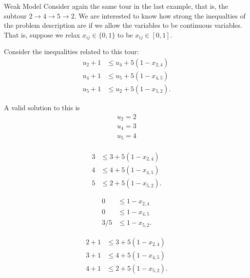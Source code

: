 \begin{example}{Weak Model}{}
Consider again the same tour in the last example, that is, the subtour $2 \to 4 \to 5 \to 2$.  
We are interested to know how strong the inequalties of the problem description are if we allow the variables to be continuous variables.  That is, suppose we relax $x_{ij} \in \{0,1\}$ to be $x_{ij} \in [0,1]$.

Consider the inequalities related to this tour:
\begin{align*}
u_{2} +1 &\leq  u_{4} + 5 (1-x_{2,4} )\\
u_{4} +1 &\leq  u_{5} + 5 (1-x_{4,5})\\
u_{5} +1 &\leq  u_{2} + 5 (1-x_{5,2} ).
\end{align*}

A valid solution to this is 
\begin{align*}
u_2 = 2\\
u_4 = 3\\
u_5 = 4\\
\end{align*}

\begin{align*}
3 &\leq  3 + 5 (1-x_{2,4} )\\
4 &\leq  4 + 5 (1-x_{4,5})\\
5 &\leq  2 + 5 (1-x_{5,2} ).
\end{align*}

\begin{align*}
0&\leq   1-x_{2,4} \\
0&\leq   1-x_{4,5}\\
3 /5&\leq 1-x_{5,2} .
\end{align*}

\begin{align*}
2+1 &\leq  3 + 5 (1-x_{2,4} )\\
3 +1 &\leq  4 + 5 (1-x_{4,5})\\
4 +1 &\leq  2 + 5 (1-x_{5,2} ).
\end{align*}

\end{example}

